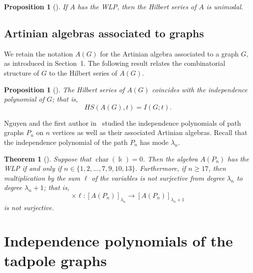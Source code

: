 \documentclass[12pt,twoside]{amsart}
\newtheorem{theorem}[thm]{Theorem}
\newtheorem{proposition}[thm]{Proposition}
\theoremstyle{definition}
\theoremstyle{mystyle}
\begin{document}
\begin{proposition}[{\rm \cite[Proposition~3.2]{HMMNWW13}}]\label{Proposition2.8}
If $A$ has the WLP, then the Hilbert series of $A$ is unimodal.
\end{proposition}













\subsection{Artinian algebras associated to graphs}
We retain the notation $A(G)$ for the Artinian algebra associated to
a graph $G$, as introduced in Section~1. The following result relates
the combinatorial structure of $G$ to the Hilbert series of $A(G)$.

\begin{proposition}[{\rm \cite{NT24b}}]
The Hilbert series of $A(G)$ coincides with the independence polynomial of $G$; that is,
	\[
	HS(A(G), t) = I(G; t).
	\]
\end{proposition}
Nguyen and the first author in~\cite{NT24b} studied the independence polynomials of path graphs $P_n$ on $n$ vertices as well as their associated Artinian algebras. 
Recall that the independence
polynomial of the path $P_n$ has mode $\lambda_n$.

\begin{theorem}[{\rm \cite[Theorem~4.2]{NT24b}}]\label{WLP for P_n}
Suppose that $\operatorname{char}(\Bbbk) = 0$. Then the algebra $A(P_n)$ has the WLP if and only if $n \in \{1, 2, \dots, 7, 9, 10, 13\}.$
Furthermore, if $n\geq17$, then multiplication by the sum $\ell$ of
the variables is not surjective from degree $\lambda_n$ to degree
$\lambda_n+1$; that is,
\[
\times\ell:[A(P_n)]_{\lambda_n}
\longrightarrow[A(P_n)]_{\lambda_n+1}
\]
is not surjective.
\end{theorem}








\section{Independence polynomials of the tadpole graphs}
\end{document}
